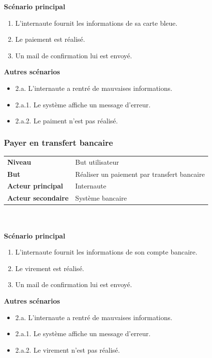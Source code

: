\documentclass[11pt,a4paper]{article}
\begin{document}
\textbf{Scénario principal}

\begin{enumerate}
    \item L'internaute fournit les informations de sa carte bleue.
    \item Le paiement est réalisé.
    \item Un mail de confirmation lui est envoyé.
\end{enumerate}

\textbf{Autres scénarios}

\begin{itemize}[label=]
    \item 2.a. L'internaute a rentré de mauvaises informations.
    \item 2.a.1. Le système affiche un message d'erreur.
    \item 2.a.2. Le paiment n'est pas réalisé.
\end{itemize}

\subsubsection{Payer en transfert bancaire}

\begin{tabular}{ll}
    \textbf{Niveau} & But utilisateur \\
    \textbf{But} & Réaliser un paiement par transfert bancaire \\
    \textbf{Acteur principal} & Internaute \\
    \textbf{Acteur secondaire} & Système bancaire \newline
\end{tabular}
~\\
~\\

\textbf{Scénario principal}

\begin{enumerate}
    \item L'internaute fournit les informations de son compte bancaire.
    \item Le virement est réalisé.
    \item Un mail de confirmation lui est envoyé.
\end{enumerate}

\textbf{Autres scénarios}

\begin{itemize}[label=]
    \item 2.a. L'internaute a rentré de mauvaises informations.
    \item 2.a.1. Le système affiche un message d'erreur.
    \item 2.a.2. Le virement n'est pas réalisé.
\end{itemize}
\end{document}
